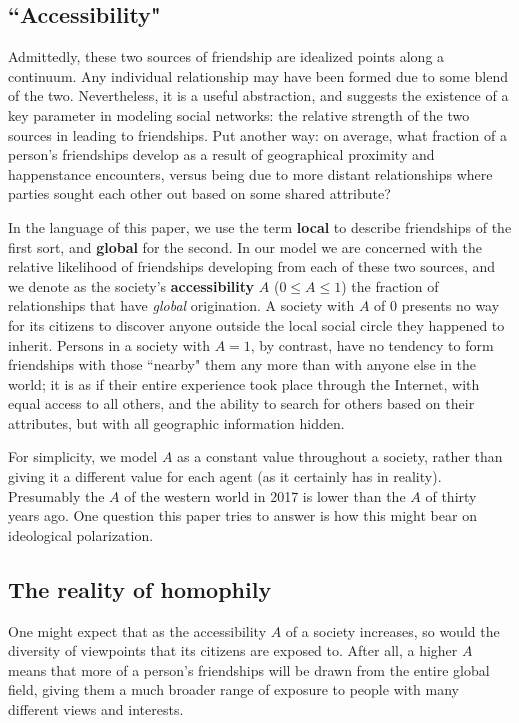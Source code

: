 \subsection{``Accessibility"}

Admittedly, these two sources of friendship are idealized points along a
continuum. Any individual relationship may have been formed due to some blend
of the two. Nevertheless, it is a useful abstraction, and suggests the
existence of a key parameter in modeling social networks: the relative
strength of the two sources in leading to friendships. Put another way: on
average, what fraction of a person's friendships develop as a result of
geographical proximity and happenstance encounters, versus being due to more
distant relationships where parties sought each other out based on some shared
attribute? 

In the language of this paper, we use the term \textbf{local} to describe
friendships of the first sort, and \textbf{global} for the second. In our
model we are concerned with the relative likelihood of friendships developing
from each of these two sources, and we denote as the society's
\textbf{accessibility} $A$ ($0 \leq A \leq 1$) the fraction of relationships
that have \textit{global} origination. A society with $A$ of 0 presents no way
for its citizens to discover anyone outside the local social circle they
happened to inherit. Persons in a society with $A=1$, by contrast, have no
tendency to form friendships with those ``nearby" them any more than with
anyone else in the world; it is as if their entire experience took place
through the Internet, with equal access to all others, and the ability to
search for others based on their attributes, but with all geographic
information hidden.

For simplicity, we model $A$ as a constant value throughout a society, rather
than giving it a different value for each agent (as it certainly has in
reality). Presumably the $A$ of the western world in 2017 is lower than the
$A$ of thirty years ago. One question this paper tries to answer is how this
might bear on ideological polarization.

\subsection{The reality of homophily}

One might expect that as the accessibility $A$ of a society increases, so
would the diversity of viewpoints that its citizens are exposed to. After all,
a higher $A$ means that more of a person's friendships will be drawn from the
entire global field, giving them a much broader range of exposure to people
with many different views and interests.

